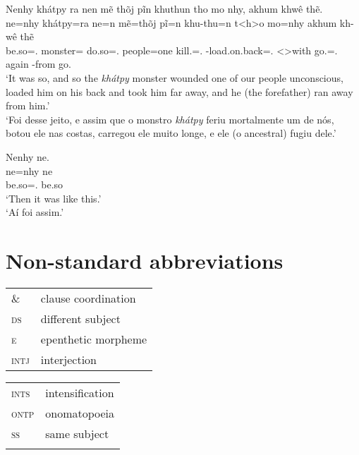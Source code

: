 \documentclass[output=paper,
modfonts,nonflat
]{langsci/langscibook}
\begin{document}
\newpage 
\ea  Nenhy khátpy ra nen mẽ thõj pĩn khuthun tho mo nhy, akhum khwê thẽ. \\[.3em]
\gll ne=nhy           khátpy=ra      ne=n             mẽ=thõj    pĩ=n                khu-thu=n                      t<h>o        mo=nhy              akhum kh-wê       thẽ      \\
     be.so=\AAnd.\Ds{} monster=\Nom{} do.so=\AAnd.\Ss{} people=one kill.\Sg=\AAnd.\Ss{} \Third-load.on.back=\AAnd.\Ss{} <\Third>with go.\Pl{}=\AAnd.\Ds{} again \Third-from go.\Sg{} \\
\glt `It was so, and so the \textit{khátpy} monster wounded one of our people unconscious, loaded him on his back and took him far away, and he (the forefather) ran away from him.' \\
     `Foi desse jeito, e assim que o monstro \textit{khátpy} feriu mortalmente um de nós, botou ele nas costas, carregou ele muito longe, e ele (o ancestral) fugiu dele.' \\
\z

\ea  Nenhy ne. \\[.3em]
\gll ne=nhy           ne    \\
     be.so=\AAnd.\Ds{} be.so \\
\glt `Then it was like this.' \\
     `Aí foi assim.' \\
\z

\section*{Non-standard abbreviations}

\begin{tabularx}{.45\textwidth}{lX}
\&             & clause coordination \\
\textsc{ds}    & different subject \\
\textsc{e}     & epenthetic morpheme \\
\textsc{intj}  & interjection \\
\end{tabularx}
\begin{tabularx}{.45\textwidth}{lX}
\textsc{ints}  & intensification \\
\textsc{ontp}  & onomatopoeia \\
\textsc{ss}    & same subject \\
\\
\end{tabularx}

{\sloppy
\printbibliography[heading=subbibliography,notkeyword=this]
}
\end{document}
